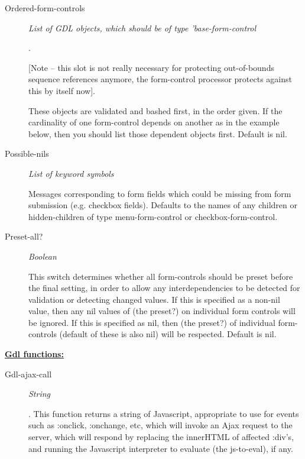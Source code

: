 \documentclass [11pt]{book}
\begin{document}
\begin{itemize}
\begin{description}
\item [Ordered-form-controls]
\emph{List of GDL objects, which should be of type 'base-form-control}

.



[Note -- this slot is not really necessary for protecting out-of-bounds sequence references
anymore, the form-control processor protects against this by itself now].



These objects are validated and bashed first, in the order given. If the cardinality
of one form-control depends on another as in the example below, then you should list
those dependent objects first. Default is nil.




\item [Possible-nils]
\emph{List of keyword symbols}

 Messages corresponding to form fields which could
be missing from form submission (e.g. checkbox fields). Defaults to the names
of any children or hidden-children of type  menu-form-control or
checkbox-form-control.




\item [Preset-all?]
\emph{Boolean}

 This switch determines whether all form-controls should be preset
before the final setting, in order to allow any interdependencies to be detected
for validation or detecting changed values. If this is specified as a non-nil
value, then any nil values of (the preset?) on individual form controls will be
ignored. If this is specified as nil, then (the preset?) of individual
form-controls (default of these is also nil) will be respected. Default is nil.




\end{description}






\textbf{
\underline{Gdl functions:}}

\begin{description}

\item [Gdl-ajax-call]
\emph{String}

.
This function returns a string of Javascript, appropriate to use for events
such as :onclick, :onchange, etc, which will invoke an Ajax request to the
server, which will respond by replacing the innerHTML of affected :div's, and
running the Javascript interpreter to evaluate (the js-to-eval), if any.





\end{description}
\end{itemize}
\end{document}
